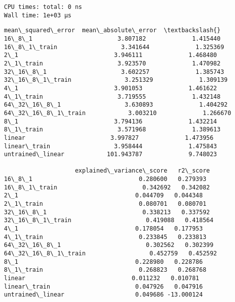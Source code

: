 \documentclass[11pt]{article}
\makeatletter
\newcommand{\boxspacing}{\kern\kvtcb@left@rule\kern\kvtcb@boxsep}
\newcommand{\prompt}[4]{
        {\ttfamily\llap{{\color{#2}[#3]:\hspace{3pt}#4}}\vspace{-\baselineskip}}
    }
\makeatother
\begin{document}
    \begin{Verbatim}[commandchars=\\\{\}]
CPU times: total: 0 ns
Wall time: 1e+03 µs
    \end{Verbatim}

            \begin{tcolorbox}[breakable, size=fbox, boxrule=.5pt, pad at break*=1mm, opacityfill=0]
\prompt{Out}{outcolor}{45}{\boxspacing}
\begin{Verbatim}[commandchars=\\\{\}]
                    mean\_squared\_error  mean\_absolute\_error  \textbackslash{}
16\_8\_1                        3.807182             1.415440
16\_8\_1\_train                  3.341644             1.325369
2\_1                           3.946111             1.468480
2\_1\_train                     3.923570             1.470982
32\_16\_8\_1                     3.602257             1.385743
32\_16\_8\_1\_train               3.251329             1.309139
4\_1                           3.901053             1.461622
4\_1\_train                     3.719555             1.432148
64\_32\_16\_8\_1                  3.630893             1.404292
64\_32\_16\_8\_1\_train            3.003210             1.266670
8\_1                           3.794136             1.432214
8\_1\_train                     3.571968             1.389613
linear                        3.997827             1.473956
linear\_train                  3.958444             1.475843
untrained\_linear            101.943787             9.748023

                    explained\_variance\_score   r2\_score
16\_8\_1                              0.280600   0.279393
16\_8\_1\_train                        0.342692   0.342082
2\_1                                 0.044709   0.044348
2\_1\_train                           0.080701   0.080701
32\_16\_8\_1                           0.338213   0.337592
32\_16\_8\_1\_train                     0.419088   0.418564
4\_1                                 0.178054   0.177953
4\_1\_train                           0.233845   0.233813
64\_32\_16\_8\_1                        0.302562   0.302399
64\_32\_16\_8\_1\_train                  0.452759   0.452592
8\_1                                 0.228980   0.228786
8\_1\_train                           0.268823   0.268768
linear                              0.011232   0.010781
linear\_train                        0.047926   0.047916
untrained\_linear                    0.049686 -13.000124
\end{Verbatim}
\end{tcolorbox}
        
\end{document}
